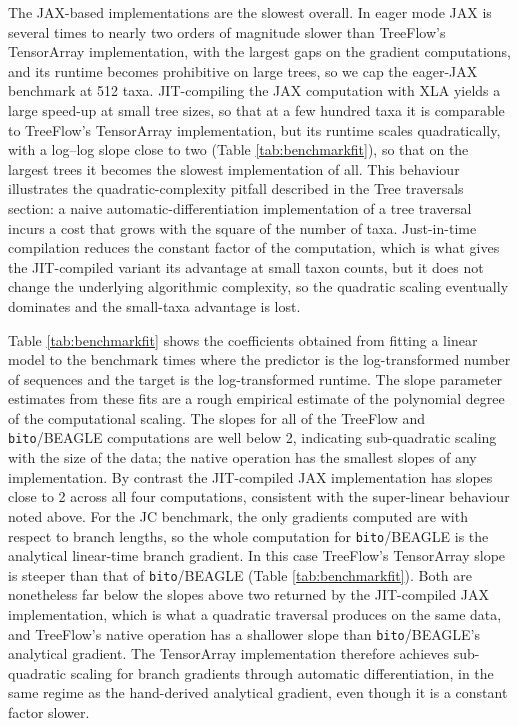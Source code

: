 \documentclass{article}
\begin{document}
The JAX-based implementations are the slowest overall. In eager mode JAX is several times to nearly two orders of magnitude slower than TreeFlow's TensorArray implementation, with the largest gaps on the gradient computations, and its runtime becomes prohibitive on large trees, so we cap the eager-JAX benchmark at 512 taxa. JIT-compiling the JAX computation with XLA yields a large speed-up at small tree sizes, so that at a few hundred taxa it is comparable to TreeFlow's TensorArray implementation, but its runtime scales quadratically, with a log--log slope close to two (Table \ref{tab:benchmarkfit}), so that on the largest trees it becomes the slowest implementation of all. This behaviour illustrates the quadratic-complexity pitfall described in the Tree traversals section: a naive automatic-differentiation implementation of a tree traversal incurs a cost that grows with the square of the number of taxa. Just-in-time compilation reduces the constant factor of the computation, which is what gives the JIT-compiled variant its advantage at small taxon counts, but it does not change the underlying algorithmic complexity, so the quadratic scaling eventually dominates and the small-taxa advantage is lost.

Table \ref{tab:benchmarkfit} shows the coefficients obtained from fitting a linear model to the benchmark times where the predictor is the log-transformed number of sequences and the target is the log-transformed runtime. The slope parameter estimates from these fits are a rough empirical estimate of the polynomial degree of the computational scaling. The slopes for all of the TreeFlow and \texttt{bito}/BEAGLE computations are well below 2, indicating sub-quadratic scaling with the size of the data; the native operation has the smallest slopes of any implementation. By contrast the JIT-compiled JAX implementation has slopes close to 2 across all four computations, consistent with the super-linear behaviour noted above. For the JC benchmark, the only gradients computed are with respect to branch lengths, so the whole computation for \texttt{bito}/BEAGLE is the analytical linear-time branch gradient. In this case TreeFlow's TensorArray slope is steeper than that of \texttt{bito}/BEAGLE (Table \ref{tab:benchmarkfit}). Both are nonetheless far below the slopes above two returned by the JIT-compiled JAX implementation, which is what a quadratic traversal produces on the same data, and TreeFlow's native operation has a shallower slope than \texttt{bito}/BEAGLE's analytical gradient. The TensorArray implementation therefore achieves sub-quadratic scaling for branch gradients through automatic differentiation, in the same regime as the hand-derived analytical gradient, even though it is a constant factor slower.
\end{document}
